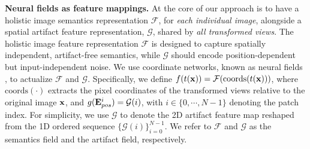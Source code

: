 \documentclass[runningheads]{llncs}
\renewcommand{\paragraph}[1]{\vspace{1.25mm}\noindent\textbf{#1}}
\begin{document}
\paragraph{Neural fields as feature mappings.} At the core of our approach is to have a holistic image semantics representation $\mathcal{F}$, for \textit{each individual image}, alongside a spatial artifact feature representation, $\mathcal{G}$, shared by \textit{all transformed views}. The holistic image feature representation $\mathcal{F}$ is designed to capture spatially independent, artifact-free semantics, while $\mathcal{G}$ should encode position-dependent but input-independent noise. We use coordinate networks, known as neural fields \cite{tancik2020fourfeat,muller2022instant,shen2023distilled,kobayashi2022decomposing,kerr2023lerf,yang2023emernerf}, to actualize $\mathcal{F}$ and $\mathcal{G}$. Specifically, we define $f(t(\vb{x}))=\mathcal{F}(\mathrm{coords}(t(\vb{x})))$, where $\mathrm{coords}(\cdot)$ extracts the pixel coordinates of the transformed views relative to the original image $\vb{x}$, and $g(\vb{E}^{i}_{pos})=\mathcal{G}(i)$, with $i \in \{0, \cdots, N-1\}$ denoting the patch index. For simplicity, we use $\mathcal{G}$ to denote the 2D artifact feature map reshaped from the 1D ordered sequence $\{\mathcal{G}(i)\}_{i=0}^{N-1}$. We refer to $\mathcal{F}$ and $\mathcal{G}$ as the semantics field and the artifact field, respectively.
\end{document}
